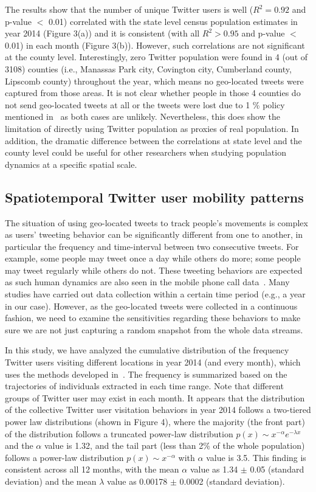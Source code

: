 \documentclass[a4paper, 11pt]{article}
\begin{document}
The results show that the number of unique Twitter users is well ($R^{2}=0.92$ and p-value $<$ 0.01) correlated with the state level census population estimates in year 2014 (Figure 3(a)) and it is consistent (with all $R^{2} > 0.95$ and p-value $<$ 0.01) in each month (Figure 3(b)).
However, such correlations are not significant at the county level. 
Interestingly, zero Twitter population were found in  4 (out of 3108) counties (i.e., Manassas Park city, Covington city, Cumberland county, Lipscomb county) throughout the year, which means no geo-located tweets were captured from those areas. 
It is not clear whether people in those 4 counties do not send geo-located tweets at all or the tweets were lost due to 1 \% policy mentioned in~\citep{hawelka2014geo} as both cases are unlikely. Nevertheless, this does show the limitation of directly using Twitter population as proxies of real population. 
In addition,  the dramatic difference between the correlations at state level and the county level could be useful for other researchers when studying population dynamics at a specific spatial scale.

\subsection{Spatiotemporal Twitter user mobility patterns}
The situation of using geo-located tweets to track people's movements is complex as users' tweeting behavior can be significantly different from one to another, in particular the frequency and time-interval between two consecutive tweets. For example, some people may tweet once a day while others do more; some people may tweet regularly while others do not.  
These tweeting behaviors are expected as such human dynamics are also seen in the mobile phone call data~\citep{gonzalez2008understanding}. 
Many studies have carried out data collection within a certain time period (e.g., a year in our case).
However, as the geo-located tweets were collected in a continuous fashion, we need to examine the sensitivities regarding these behaviors to make sure we are not just capturing a random snapshot from the whole data streams. 

In this study, we have analyzed the cumulative distribution of the frequency Twitter users visiting different locations in year 2014 (and every month), which uses the methods developed in~\citep{clauset2009power}. 
The frequency is summarized based on the trajectories of individuals extracted in each time range. Note that different groups of Twitter user may exist in each month. 
It appears that the distribution of the collective Twitter user visitation behaviors in year 2014 follows a two-tiered power law distributions (shown in Figure 4), where the majority (the front part) of the distribution follows a truncated power-law distribution $p(x)\sim x^{-\alpha}e^{-\lambda x}$ and the $\alpha$ value is 1.32, and the tail part (less than 2$\%$ of the whole population) follows a power-law distribution  $p(x)\sim x^{-\alpha}$ with $\alpha$ value is 3.5.
This finding is consistent across all 12 months, with the mean $\alpha$ value as 1.34 $ \pm$  0.05 (standard deviation) and the mean $\lambda$ value as 0.00178 $ \pm$  0.0002 (standard deviation). 
\end{document}
